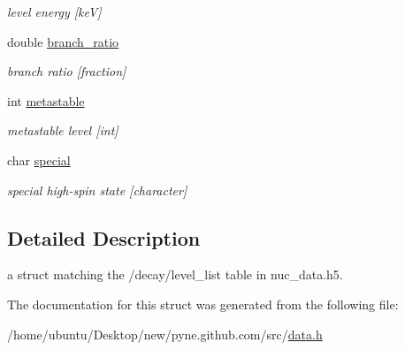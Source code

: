 \begin{DoxyCompactItemize}
\begin{DoxyCompactList}\small\item\em level energy \mbox{[}keV\mbox{]} \end{DoxyCompactList}\item 
double \hyperlink{structpyne_1_1level__data_a5ce97c540e0ce558156e5a43510a4633}{branch\+\_\+ratio}\hypertarget{structpyne_1_1level__data_a5ce97c540e0ce558156e5a43510a4633}{}\label{structpyne_1_1level__data_a5ce97c540e0ce558156e5a43510a4633}

\begin{DoxyCompactList}\small\item\em branch ratio \mbox{[}fraction\mbox{]} \end{DoxyCompactList}\item 
int \hyperlink{structpyne_1_1level__data_a7a71068eed39597f007cc6624727e954}{metastable}\hypertarget{structpyne_1_1level__data_a7a71068eed39597f007cc6624727e954}{}\label{structpyne_1_1level__data_a7a71068eed39597f007cc6624727e954}

\begin{DoxyCompactList}\small\item\em metastable level \mbox{[}int\mbox{]} \end{DoxyCompactList}\item 
char \hyperlink{structpyne_1_1level__data_acabc31aa71741dbc2ea5485ca51da0d6}{special}\hypertarget{structpyne_1_1level__data_acabc31aa71741dbc2ea5485ca51da0d6}{}\label{structpyne_1_1level__data_acabc31aa71741dbc2ea5485ca51da0d6}

\begin{DoxyCompactList}\small\item\em special high-\/spin state \mbox{[}character\mbox{]} \end{DoxyCompactList}\end{DoxyCompactItemize}


\subsection{Detailed Description}
a struct matching the \textquotesingle{}/decay/level\+\_\+list\textquotesingle{} table in nuc\+\_\+data.\+h5. 

The documentation for this struct was generated from the following file\+:\begin{DoxyCompactItemize}
\item 
/home/ubuntu/\+Desktop/new/pyne.\+github.\+com/src/\hyperlink{data_8h}{data.\+h}\end{DoxyCompactItemize}

